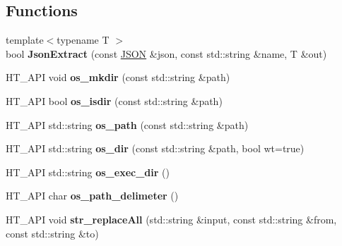 \subsection*{Functions}
\begin{DoxyCompactItemize}
\item 
{\footnotesize template$<$typename T $>$ }\\bool {\bfseries Json\+Extract} (const \hyperlink{namespaceHatchit_1_1Core_a58a6350dd2a195178625a9f423a71b1c}{J\+S\+ON} \&json, const std\+::string \&name, T \&out)\hypertarget{namespaceHatchit_1_1Core_a69209c6f14d9daa5d2eee43211058ee1}{}\label{namespaceHatchit_1_1Core_a69209c6f14d9daa5d2eee43211058ee1}

\item 
H\+T\+\_\+\+A\+PI void {\bfseries os\+\_\+mkdir} (const std\+::string \&path)\hypertarget{namespaceHatchit_1_1Core_ada6dafa34682ddf11a428f1afd087d31}{}\label{namespaceHatchit_1_1Core_ada6dafa34682ddf11a428f1afd087d31}

\item 
H\+T\+\_\+\+A\+PI bool {\bfseries os\+\_\+isdir} (const std\+::string \&path)\hypertarget{namespaceHatchit_1_1Core_af5539c53cda834892639880ce83f07b2}{}\label{namespaceHatchit_1_1Core_af5539c53cda834892639880ce83f07b2}

\item 
H\+T\+\_\+\+A\+PI std\+::string {\bfseries os\+\_\+path} (const std\+::string \&path)\hypertarget{namespaceHatchit_1_1Core_a475971d07c33df39e7fe4b72f9e4f021}{}\label{namespaceHatchit_1_1Core_a475971d07c33df39e7fe4b72f9e4f021}

\item 
H\+T\+\_\+\+A\+PI std\+::string {\bfseries os\+\_\+dir} (const std\+::string \&path, bool wt=true)\hypertarget{namespaceHatchit_1_1Core_a3e275c86e7b5fc6a1efad72ddce1ef43}{}\label{namespaceHatchit_1_1Core_a3e275c86e7b5fc6a1efad72ddce1ef43}

\item 
H\+T\+\_\+\+A\+PI std\+::string {\bfseries os\+\_\+exec\+\_\+dir} ()\hypertarget{namespaceHatchit_1_1Core_a723c20b12c91d492e3b05e8180a0c924}{}\label{namespaceHatchit_1_1Core_a723c20b12c91d492e3b05e8180a0c924}

\item 
H\+T\+\_\+\+A\+PI char {\bfseries os\+\_\+path\+\_\+delimeter} ()\hypertarget{namespaceHatchit_1_1Core_aa8dd5e72b88d07efb7016f5c599b2f93}{}\label{namespaceHatchit_1_1Core_aa8dd5e72b88d07efb7016f5c599b2f93}

\item 
H\+T\+\_\+\+A\+PI void {\bfseries str\+\_\+replace\+All} (std\+::string \&input, const std\+::string \&from, const std\+::string \&to)\hypertarget{namespaceHatchit_1_1Core_a31bba4fb447b917de997912acf912cf2}{}\label{namespaceHatchit_1_1Core_a31bba4fb447b917de997912acf912cf2}

\end{DoxyCompactItemize}
